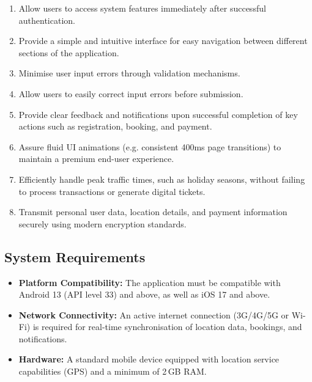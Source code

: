 \begin{enumerate}
 \item Allow users to access system features immediately after successful
authentication.

 \item Provide a simple and intuitive interface for easy navigation
between different sections of the application.

 \item Minimise user input errors through validation mechanisms.
 \item Allow users to easily correct input errors before submission.
 \item Provide clear feedback and notifications upon successful
completion of key actions such as registration, booking, and payment.

 \item Assure fluid UI animations (e.g. consistent 400ms page
transitions) to maintain a premium end-user experience.

 \item Efficiently handle peak traffic times, such as holiday seasons,
without failing to process transactions or generate digital tickets.

 \item Transmit personal user data, location details, and payment
information securely using modern encryption standards.

\end{enumerate}

\subsection{System Requirements}

\begin{itemize}
 \item \textbf{Platform Compatibility:} The application must be
compatible with Android 13 (API level 33) and above, as well as iOS 17 and
above.

 \item \textbf{Network Connectivity:} An active internet connection
(3G/4G/5G or Wi-Fi) is required for real-time synchronisation of location data,
bookings, and notifications.

 \item \textbf{Hardware:} A standard mobile device equipped with location
service capabilities (GPS) and a minimum of 2\,GB RAM.

\end{itemize}

